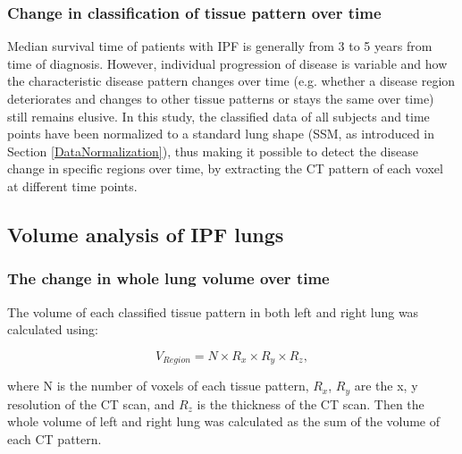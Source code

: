 \subsubsection{Change in classification of tissue pattern over time}
Median survival time of patients with IPF is generally from 3 to 5 years from time of diagnosis. However, individual progression of disease is variable and how the characteristic disease pattern changes over time (e.g. whether a disease region deteriorates and changes to other tissue patterns or stays the same over time) still remains elusive. In this study, the classified data of all subjects and time points have been normalized to a standard lung shape (SSM, as introduced in Section \ref{DataNormalization}), thus making it possible to detect the disease change in specific regions over time, by extracting the CT pattern of each voxel at different time points.

\subsection{Volume analysis of IPF lungs} \label{VolumeAnalysis}
\subsubsection{The change in whole lung volume over time}
The volume of each classified tissue pattern in both left and right lung was calculated using:

\begin{equation}
V_{Region} = N \times R_x \times R_y \times R_z,
\end{equation}

\noindent where N is the number of voxels of each tissue pattern, $R_{x}$, $R_{y}$ are the x, y resolution of the CT scan, and $R_{z}$ is the thickness of the CT scan. Then the whole volume of left and right lung was calculated as the sum of the volume of each CT pattern.


